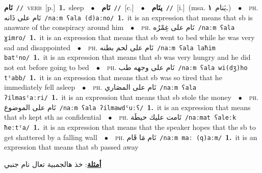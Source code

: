 \documentclass[10pt,a4paper,twoside]{article} %
\begin{document}
\begin{multicols}{2}
{\setlength\topsep{0pt}\textbf{\foreignlanguage{arabic}{نَام}}\ {\color{gray}\texttt{//}\color{black}}\ \textsc{verb}\ [p.]\ \textbf{1.}~sleep\ \ $\bullet$\ \ \setlength\topsep{0pt}\textbf{\foreignlanguage{arabic}{نَام}}\ {\color{gray}\texttt{//}\color{black}}\ [c.]\ \ $\bullet$\ \ \setlength\topsep{0pt}\textbf{\foreignlanguage{arabic}{ينَام}}\ {\color{gray}\texttt{//}\color{black}}\ [i.]\ \color{gray}(msa. \foreignlanguage{arabic}{يَنام}~\foreignlanguage{arabic}{\textbf{١.}})\color{black}\ \ $\bullet$\ \ \textsc{ph.} \color{gray} \foreignlanguage{arabic}{نَام على ذَانه}\color{black}\ {\color{gray}\texttt{/{\sffamily naːm ʕala (d)aːno}/}\color{black}}\ \textbf{1.}~it is an expression that means that sb is anaware of the conspiracy around him\ \ $\bullet$\ \ \textsc{ph.} \color{gray} \foreignlanguage{arabic}{نَام على غِمْرُه}\color{black}\ {\color{gray}\texttt{/{\sffamily naːm ʕala ɣimro}/}\color{black}}\ \textbf{1.}~it is an expression that means that sb went to bed while he was very sad and disappointed\ \ $\bullet$\ \ \textsc{ph.} \color{gray} \foreignlanguage{arabic}{نَام على لحم بطنه}\color{black}\ {\color{gray}\texttt{/{\sffamily naːm ʕala laħim batˤno}/}\color{black}}\ \textbf{1.}~it is an expression that means that sb was very hungry and he did not eat before going to bed\ \ $\bullet$\ \ \textsc{ph.} \color{gray} \foreignlanguage{arabic}{نَام على وجهه طب}\color{black}\ {\color{gray}\texttt{/{\sffamily naːm ʕala wi(dʒ)ho tˤabb}/}\color{black}}\ \textbf{1.}~it is an expression that means that sb was so tired that he immediately fell asleep\ \ $\bullet$\ \ \textsc{ph.} \color{gray} \foreignlanguage{arabic}{نَام على المصَاري}\color{black}\ {\color{gray}\texttt{/{\sffamily naːm ʕala ʔilmasˤaːri}/}\color{black}}\ \textbf{1.}~it is an expression that means that sb stole the money\ \ $\bullet$\ \ \textsc{ph.} \color{gray} \foreignlanguage{arabic}{نَام على الموضوع}\color{black}\ {\color{gray}\texttt{/{\sffamily naːm ʕala ʔilmawdˤuːʕ}/}\color{black}}\ \textbf{1.}~it is an expression that means that sb kept sth as confidential\ \ $\bullet$\ \ \textsc{ph.} \color{gray} \foreignlanguage{arabic}{نَامت عليك حيطَة}\color{black}\ {\color{gray}\texttt{/{\sffamily naːmat ʕaleːk ħeːtˤa}/}\color{black}}\ \textbf{1.}~it is an expression that means that the speaker hopes that the sb to get shattered by a falling wall\ \ $\bullet$\ \ \textsc{ph.} \color{gray} \foreignlanguage{arabic}{نَام مَا قَام}\color{black}\ {\color{gray}\texttt{/{\sffamily naːm maː (q)aːm}/}\color{black}}\ \textbf{1.}~it is an expression that means that sb passed away\  \begin{flushright}\color{gray}\foreignlanguage{arabic}{\textbf{\underline{\foreignlanguage{arabic}{أمثلة}}}: خذ هالجمبية تعال نام جنبي}\end{flushright}\color{black}} \vspace{2mm}


\end{multicols}
\end{document}
